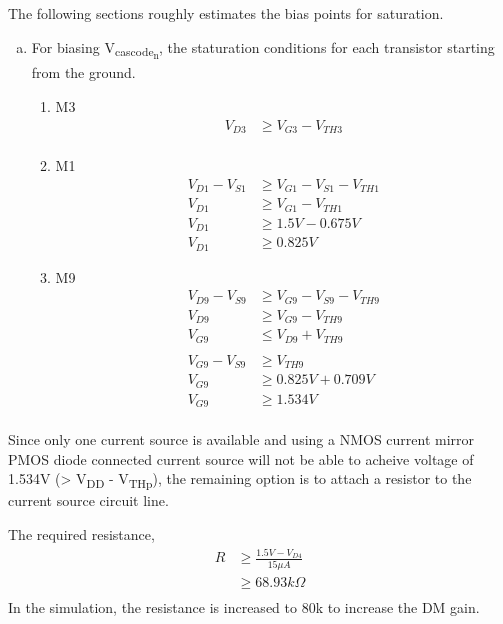 \documentclass{article}
\begin{document}
The following sections roughly estimates the bias points for saturation.
\begin{enumerate}[(a)]
\item For biasing V\textsubscript{cascode\textsubscript{n}}, the staturation conditions for each transistor starting from the ground.
\begin{enumerate}[1.]
\item M3
\begin{equation*}
\begin{aligned}
V_{D3} &\geq V_{G3} - V_{TH3} \\
\end{aligned}
\end{equation*}
\item M1
\begin{equation*}
\begin{aligned}
V_{D1} - V_{S1} &\geq V_{G1} - V_{S1} - V_{TH1} \\
V_{D1} &\geq V_{G1} - V_{TH1} \\
V_{D1} &\geq 1.5V - 0.675V \\
V_{D1} &\geq 0.825V
\end{aligned}
\end{equation*}
\item M9
\begin{equation*}
\begin{aligned}
V_{D9} - V_{S9} &\geq V_{G9} - V_{S9} - V_{TH9} \\
V_{D9} &\geq V_{G9} - V_{TH9} \\
V_{G9} &\leq V_{D9} + V_{TH9} \\
\\
V_{G9} - V_{S9} &\geq V_{TH9} \\
V_{G9} &\geq 0.825V + 0.709V \\
V_{G9} &\geq 1.534V \\
\end{aligned}
\end{equation*}
\end{enumerate}
\end{enumerate}


Since only one current source is available and using a NMOS current mirror PMOS diode connected current source will not be able to
acheive voltage of 1.534V (> V\textsubscript{DD} - V\textsubscript{THp}), the remaining option is to attach a resistor to the
current source circuit line.

The required resistance,
\begin{equation*}
\begin{aligned}
R &\geq \frac{1.5V - V_{D4}}{15\mu{}A} \\
&\geq 68.93k \Omega \\
\end{aligned}
\end{equation*}
In the simulation, the resistance is increased to 80k to increase the DM gain.
\end{document}
